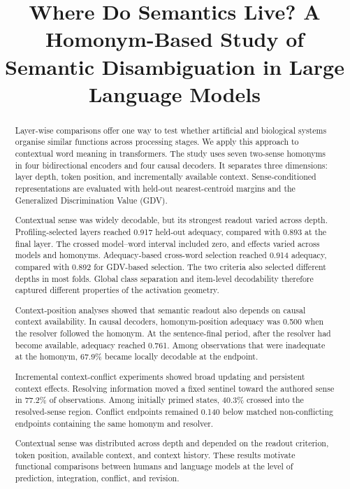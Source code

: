 \documentclass[conference]{IEEEtran}
\title{Where Do Semantics Live? A Homonym-Based Study of Semantic Disambiguation in Large Language Models}
\author{\IEEEauthorblockN{Julia Hagen, 22430997}
\IEEEauthorblockA{Friedrich-Alexander-Universit\"at Erlangen-N\"urnberg}}
\begin{document}
\raggedbottom
\maketitle
\begin{abstract}
Layer-wise comparisons offer one way to test whether artificial and biological
systems organise similar functions across processing stages. We apply this
approach to contextual word meaning in transformers. The study uses seven
two-sense homonyms in four bidirectional encoders and four causal decoders. It
separates three dimensions: layer depth, token position, and incrementally
available context. Sense-conditioned representations are evaluated with
held-out nearest-centroid margins and the Generalized Discrimination Value
(GDV).

Contextual sense was widely decodable, but its strongest readout varied across
depth. Profiling-selected layers reached 0.917 held-out adequacy, compared with
0.893 at the final layer. The crossed model--word interval included zero, and
effects varied across models and homonyms. Adequacy-based cross-word selection
reached 0.914 adequacy, compared with 0.892 for GDV-based selection. The two
criteria also selected different depths in most folds. Global class separation
and item-level decodability therefore captured different properties of the
activation geometry.

Context-position analyses showed that semantic readout also depends on causal
context availability. In causal decoders, homonym-position adequacy was 0.500
when the resolver followed the homonym. At the sentence-final period, after the
resolver had become available, adequacy reached 0.761. Among observations that
were inadequate at the homonym, 67.9\% became locally decodable at the
endpoint.

Incremental context-conflict experiments showed broad updating and persistent
context effects. Resolving information moved a fixed sentinel toward the
authored sense in 77.2\% of observations. Among initially primed states, 40.3\%
crossed into the resolved-sense region. Conflict endpoints remained 0.140 below
matched non-conflicting endpoints containing the same homonym and resolver.

Contextual sense was distributed across depth and depended on the readout
criterion, token position, available context, and context history. These
results motivate functional comparisons between humans and language models at
the level of prediction, integration, conflict, and revision.
\end{abstract}
\end{document}
